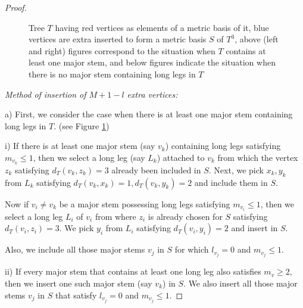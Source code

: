 \documentclass{article}
\theoremstyle{definition}
\numberwithin{equation}{section}
\begin{document}
\begin{proof}
\begin{figure}[ht]
\begin{center}
\caption{ Tree $T$ having red vertices as elements of a metric basis of it, blue vertices are extra inserted to form a metric basis $S$ of $T^{3}$, above (left and right) figures correspond to the situation when $T$ contains at least one major stem, and below figures indicate the situation when there is no major stem containing long legs in $T$} \label{fig3i}
\end{center}
\end{figure}


\noindent \textit{Method of insertion of $M+1-l$  extra vertices:}

\vspace{0.6em}

\noindent a) First, we consider the case when there is at least one major stem containing long legs in $T$. (see Figure \ref{fig3i})

\vspace{0.4em}


i) If there is at least one major stem (say $v_{k}$) containing long legs satisfying $m_{v_{k}}\leq 1$, then we select a long leg (say $L_k$) attached to $v_{k}$ from which the vertex $z_{k}$ satisfying $d_{T}(v_{k},z_{k})=3$ already been included in $S$. Next, we pick $x_{k},y_{k}$ from $L_{k}$ satisfying $d_{T}(v_{k},x_{k})=1, d_{T}(v_{k},y_{k})=2$ and include them in $S$. 

\vspace{0.4em}
Now if $v_{i}\neq v_{k}$ be a major stem possessing long legs satisfying $m_{v_{i}}\leq 1$, then we select a long leg $L_{i}$ of $v_{i}$ from where $z_{i}$ is already chosen for $S$ satisfying $d_{T}(v_{i},z_{i})=3$. We pick $y_{i}$ from $L_{i}$ satisfying $d_{T}(v_{i},y_{i})=2$ and insert in $S$.
\vspace{0.4em}
 
Also, we include all those major stems $v_{j}$ in $S$ for which $l_{v_{j}}=0$ and $m_{v_{j}}\leq 1$. 
\vspace{0.4em}

ii) If every major stem that contains at least one long leg also satisfies $m_{v}\geq 2$, then we insert one such major stem (say $v_{k}$) in $S$.  We also insert all those major stems $v_{j}$ in $S$ that satisfy $l_{v_{j}}=0$ and $m_{v_{j}}\leq 1$. 

\vspace{0.7em}


\end{proof}
\end{document}
